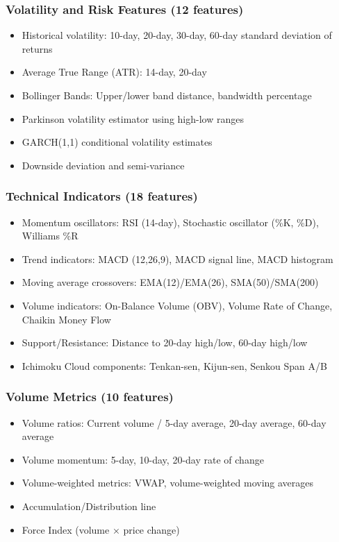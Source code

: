 \documentclass[conference]{IEEEtran}
\begin{document}
\subsubsection{Volatility and Risk Features (12 features)}
\begin{itemize}
\item Historical volatility: 10-day, 20-day, 30-day, 60-day standard deviation of returns
\item Average True Range (ATR): 14-day, 20-day
\item Bollinger Bands: Upper/lower band distance, bandwidth percentage
\item Parkinson volatility estimator using high-low ranges
\item GARCH(1,1) conditional volatility estimates
\item Downside deviation and semi-variance
\end{itemize}

\subsubsection{Technical Indicators (18 features)}
\begin{itemize}
\item Momentum oscillators: RSI (14-day), Stochastic oscillator (\%K, \%D), Williams \%R
\item Trend indicators: MACD (12,26,9), MACD signal line, MACD histogram
\item Moving average crossovers: EMA(12)/EMA(26), SMA(50)/SMA(200)
\item Volume indicators: On-Balance Volume (OBV), Volume Rate of Change, Chaikin Money Flow
\item Support/Resistance: Distance to 20-day high/low, 60-day high/low
\item Ichimoku Cloud components: Tenkan-sen, Kijun-sen, Senkou Span A/B
\end{itemize}

\subsubsection{Volume Metrics (10 features)}
\begin{itemize}
\item Volume ratios: Current volume / 5-day average, 20-day average, 60-day average
\item Volume momentum: 5-day, 10-day, 20-day rate of change
\item Volume-weighted metrics: VWAP, volume-weighted moving averages
\item Accumulation/Distribution line
\item Force Index (volume × price change)
\end{itemize}
\end{document}

